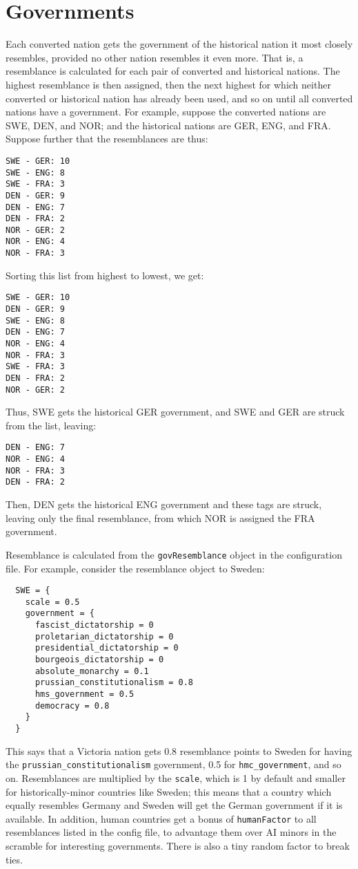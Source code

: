 \documentclass[12pt,ebook,oneside]{book}
\begin{document}
\section{Governments}

Each converted nation gets the government of the historical nation it
most closely resembles, provided no other nation resembles it even
more. That is, a resemblance is calculated for each pair of converted
and historical nations. The highest resemblance is then assigned, then
the next highest for which neither converted or historical nation has
already been used, and so on until all converted nations have a
government. For example, suppose the converted nations are SWE, DEN,
and NOR; and the historical nations are GER, ENG, and FRA. Suppose
further that the resemblances are thus:
\begin{verbatim}
SWE - GER: 10
SWE - ENG: 8
SWE - FRA: 3
DEN - GER: 9
DEN - ENG: 7
DEN - FRA: 2
NOR - GER: 2
NOR - ENG: 4
NOR - FRA: 3
\end{verbatim}
Sorting this list from highest to lowest, we get:
\begin{verbatim}
SWE - GER: 10
DEN - GER: 9
SWE - ENG: 8
DEN - ENG: 7
NOR - ENG: 4
NOR - FRA: 3
SWE - FRA: 3
DEN - FRA: 2
NOR - GER: 2
\end{verbatim}
Thus, SWE gets the historical GER government, and SWE and GER are
struck from the list, leaving:
\begin{verbatim}
DEN - ENG: 7
NOR - ENG: 4
NOR - FRA: 3
DEN - FRA: 2
\end{verbatim}
Then, DEN gets the historical ENG government and these tags are
struck, leaving only the final resemblance, from which NOR is assigned
the FRA government. 

Resemblance is calculated from the \texttt{govResemblance} object in
the configuration file. For example, consider the resemblance object
to Sweden:
\begin{verbatim}
  SWE = {
    scale = 0.5
    government = {
      fascist_dictatorship = 0
      proletarian_dictatorship = 0 
      presidential_dictatorship = 0
      bourgeois_dictatorship = 0
      absolute_monarchy = 0.1
      prussian_constitutionalism = 0.8
      hms_government = 0.5
      democracy = 0.8
    }
  }
\end{verbatim}
This says that a Victoria nation gets 0.8 resemblance points to Sweden for
having the \texttt{prussian\_constitutionalism} government, 0.5 for
\texttt{hmc\_government}, and so on. Resemblances are multiplied by
the \texttt{scale}, which is 1 by default and smaller for
historically-minor countries like Sweden; this means that a country
which equally resembles Germany and Sweden will get the German
government if it is available. In addition, human countries get a
bonus of \texttt{humanFactor} to all resemblances listed in the config
file, to advantage them
over AI minors in the scramble for interesting governments. There is
also a tiny random factor to break ties. 
\end{document}
